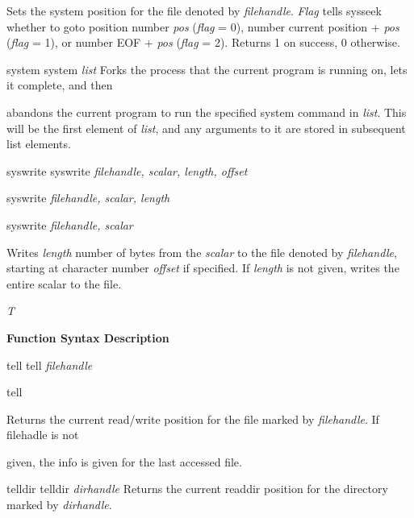 \documentclass[a4paper,11pt]{book}
\begin{document}
\noindent Sets the system position for the file denoted by \textit{filehandle}. \textit{Flag }tells sysseek whether to goto position number \textit{pos }(\textit{flag }= 0), number current position + \textit{pos }(\textit{flag }= 1), or number EOF + \textit{pos }(\textit{flag }= 2). Returns 1 on success, 0 otherwise.

\noindent 

\noindent system system \textit{list }Forks the process that the current program is running on, lets it complete, and then

\noindent abandons the current program to run the specified system command in \textit{list}. This will be the first element of \textit{list}, and any arguments to it are stored in subsequent list elements.

\noindent 

\noindent syswrite syswrite \textit{filehandle, scalar, length, offset}

\noindent 

\noindent syswrite \textit{filehandle, scalar, length}

\noindent 

\noindent syswrite \textit{filehandle, scalar}

\noindent 

\noindent Writes \textit{length }number of bytes from the \textit{scalar }to the file denoted by \textit{filehandle}, starting at character number \textit{offset }if specified. If \textit{length }is not given, writes the entire scalar to the file.

\noindent 

\noindent 

\noindent 

\noindent \textit{T}

\noindent 

\noindent \textbf{Function Syntax Description}

\noindent 

\noindent tell tell \textit{filehandle}

\noindent 

\noindent tell

\noindent 

\noindent Returns the current read/write position for the file marked by \textit{filehandle}. If filehadle is not

\noindent given, the info is given for the last accessed file.

\noindent 

\noindent telldir telldir \textit{dirhandle }Returns the current readdir position for the directory marked by \textit{dirhandle}.
\end{document}
